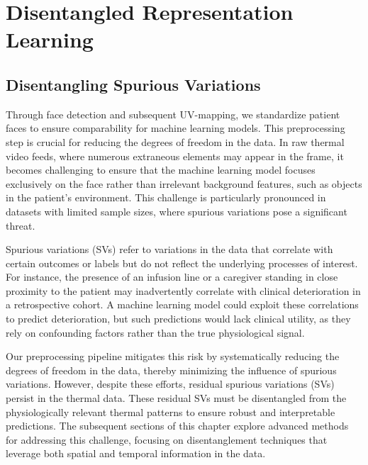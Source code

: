 \chapter{Disentangled Representation Learning}
\label{ch:learning-reps}


\section{Disentangling Spurious Variations}
Through face detection and subsequent UV-mapping, we standardize patient faces to ensure comparability for machine learning models. This preprocessing step is crucial for reducing the degrees of freedom in the data. In raw thermal video feeds, where numerous extraneous elements may appear in the frame, it becomes challenging to ensure that the machine learning model focuses exclusively on the face rather than irrelevant background features, such as objects in the patient’s environment. This challenge is particularly pronounced in datasets with limited sample sizes, where spurious variations pose a significant threat.

Spurious variations (SVs) refer to variations in the data that correlate with certain outcomes or labels but do not reflect the underlying processes of interest. For instance, the presence of an infusion line or a caregiver standing in close proximity to the patient may inadvertently correlate with clinical deterioration in a retrospective cohort. A machine learning model could exploit these correlations to predict deterioration, but such predictions would lack clinical utility, as they rely on confounding factors rather than the true physiological signal.

Our preprocessing pipeline mitigates this risk by systematically reducing the degrees of freedom in the data, thereby minimizing the influence of spurious variations. However, despite these efforts, residual spurious variations (SVs) persist in the thermal data. These residual SVs must be disentangled from the physiologically relevant thermal patterns to ensure robust and interpretable predictions. The subsequent sections of this chapter explore advanced methods for addressing this challenge, focusing on disentanglement techniques that leverage both spatial and temporal information in the data.

